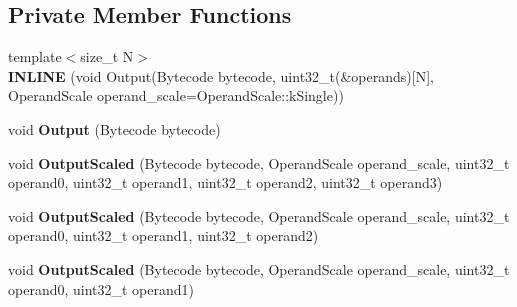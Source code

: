 \subsection*{Private Member Functions}
\begin{DoxyCompactItemize}
\item 
{\footnotesize template$<$size\+\_\+t N$>$ }\\{\bfseries I\+N\+L\+I\+NE} (void Output(Bytecode bytecode, uint32\+\_\+t(\&operands)\mbox{[}N\mbox{]},                                                                           Operand\+Scale operand\+\_\+scale=Operand\+Scale\+::k\+Single))\hypertarget{classv8_1_1internal_1_1interpreter_1_1_bytecode_array_builder_a8a9b88a7a0a693136d3b20bd90be19e7}{}\label{classv8_1_1internal_1_1interpreter_1_1_bytecode_array_builder_a8a9b88a7a0a693136d3b20bd90be19e7}

\item 
void {\bfseries Output} (Bytecode bytecode)\hypertarget{classv8_1_1internal_1_1interpreter_1_1_bytecode_array_builder_ac9794d162285bf9a61d412f587fe859d}{}\label{classv8_1_1internal_1_1interpreter_1_1_bytecode_array_builder_ac9794d162285bf9a61d412f587fe859d}

\item 
void {\bfseries Output\+Scaled} (Bytecode bytecode, Operand\+Scale operand\+\_\+scale, uint32\+\_\+t operand0, uint32\+\_\+t operand1, uint32\+\_\+t operand2, uint32\+\_\+t operand3)\hypertarget{classv8_1_1internal_1_1interpreter_1_1_bytecode_array_builder_aea0dd06101242e3c0d2453d3bdb70d18}{}\label{classv8_1_1internal_1_1interpreter_1_1_bytecode_array_builder_aea0dd06101242e3c0d2453d3bdb70d18}

\item 
void {\bfseries Output\+Scaled} (Bytecode bytecode, Operand\+Scale operand\+\_\+scale, uint32\+\_\+t operand0, uint32\+\_\+t operand1, uint32\+\_\+t operand2)\hypertarget{classv8_1_1internal_1_1interpreter_1_1_bytecode_array_builder_a2b9446f5cb41b3489bdb39600e963bda}{}\label{classv8_1_1internal_1_1interpreter_1_1_bytecode_array_builder_a2b9446f5cb41b3489bdb39600e963bda}

\item 
void {\bfseries Output\+Scaled} (Bytecode bytecode, Operand\+Scale operand\+\_\+scale, uint32\+\_\+t operand0, uint32\+\_\+t operand1)\hypertarget{classv8_1_1internal_1_1interpreter_1_1_bytecode_array_builder_af54e05ad87401da65845b2d5f8ff9f4a}{}\label{classv8_1_1internal_1_1interpreter_1_1_bytecode_array_builder_af54e05ad87401da65845b2d5f8ff9f4a}


\end{DoxyCompactItemize}
